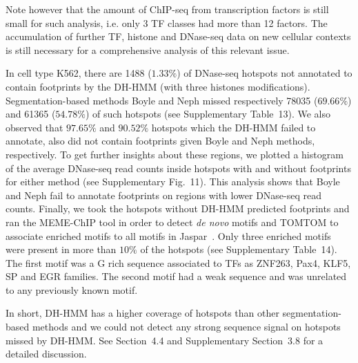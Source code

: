 \documentclass[11pt]{article}
\begin{document}
Note however that the amount of ChIP-seq from transcription factors is still small for such analysis, i.e. only 3 TF classes had more than 12 factors. The accumulation of further TF, histone and DNase-seq data on new cellular contexts is still necessary for a comprehensive analysis of this relevant issue. 


In cell type K562, there are 1488 ($1.33\%$) of DNase-seq hotspots not annotated to contain footprints by the DH-HMM (with three histones modifications). Segmentation-based methods Boyle and Neph missed respectively 78035 ($69.66\%$) and 61365 ($54.78\%$) of such hotspots (see Supplementary Table~13). We also observed that $97.65\%$ and $90.52\%$ hotspots which the DH-HMM failed to annotate, also did not contain footprints given Boyle and Neph methods, respectively. To get further insights about these regions, we plotted a histogram of the average DNase-seq read counts inside hotspots with and without footprints for either method (see Supplementary Fig.~11). This analysis  shows that Boyle and Neph fail to annotate footprints on regions with lower DNase-seq read counts. Finally, we took the hotspots without DH-HMM predicted footprints and ran the MEME-ChIP tool in order to detect \emph{de novo} motifs and TOMTOM to associate enriched motifs to all motifs in Jaspar~\citep{machanick2011}. Only three enriched motifs were present in more than $10\%$ of the hotspots (see Supplementary Table~14). The first motif was a G rich sequence associated to TFs as ZNF263, Pax4, KLF5, SP and EGR families. The second motif had a weak sequence and was unrelated to any previously known motif.

In short, DH-HMM has a higher coverage of hotspots than other segmentation-based methods and we could not detect any strong sequence signal on hotspots missed by DH-HMM. See Section~4.4 and Supplementary Section~3.8 for a detailed discussion.

\end{document}
